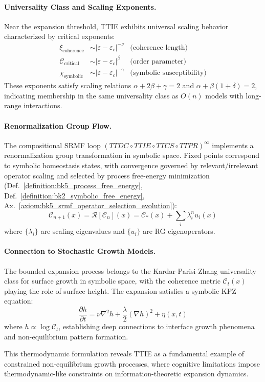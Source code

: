 \begin{demonstratio}
\paragraph{Universality Class and Scaling Exponents.}
Near the expansion threshold, TTIE exhibits universal scaling behavior characterized by critical exponents:
\begin{align}
\xi_{\text{coherence}} &\sim |\varepsilon - \varepsilon_c|^{-\nu} & \text{(coherence length)} \\
\mathcal{C}_{\text{critical}} &\sim |\varepsilon - \varepsilon_c|^{\beta} & \text{(order parameter)} \\
\chi_{\text{symbolic}} &\sim |\varepsilon - \varepsilon_c|^{-\gamma} & \text{(symbolic susceptibility)}
\end{align}
These exponents satisfy scaling relations $\alpha + 2\beta + \gamma = 2$ and $\alpha + \beta(1+\delta) = 2$, indicating membership in the same universality class as $O(n)$ models with long-range interactions.

\paragraph{Renormalization Group Flow.}
The compositional SRMF loop $(TTDC \circ TTIE \circ TTCS \circ TTPR)^{\infty}$ implements a renormalization group transformation in symbolic space.
Fixed points correspond to symbolic homeostasis states, with convergence governed by relevant/irrelevant operator scaling and selected by process free-energy minimization (Def.~\ref{definition:bk5_process_free_energy}, Def.~\ref{definition:bk2_symbolic_free_energy}, Ax.~\ref{axiom:bk5_srmf_operator_selection_evolution}):
\begin{equation}
\mathcal{C}_{n+1}(x) = \mathcal{R}[\mathcal{C}_n](x) = \mathcal{C}_*(x) + \sum_i \lambda_i^n u_i(x)
\end{equation}
where $\{\lambda_i\}$ are scaling eigenvalues and $\{u_i\}$ are RG eigenoperators.

\paragraph{Connection to Stochastic Growth Models.}
The bounded expansion process belongs to the Kardar-Parisi-Zhang universality class for surface growth in symbolic space, with the coherence metric $\mathcal{C}_t(x)$ playing the role of surface height. The expansion satisfies a symbolic KPZ equation:
\begin{equation}
\frac{\partial h}{\partial t} = \nu \nabla^2 h + \frac{\lambda}{2}(\nabla h)^2 + \eta(x,t)
\end{equation}
where $h \propto \log \mathcal{C}_t$, establishing deep connections to interface growth phenomena and non-equilibrium pattern formation.

This thermodynamic formulation reveals TTIE as a fundamental example of constrained non-equilibrium growth processes, where cognitive limitations impose thermodynamic-like constraints on information-theoretic expansion dynamics.
\end{demonstratio}

